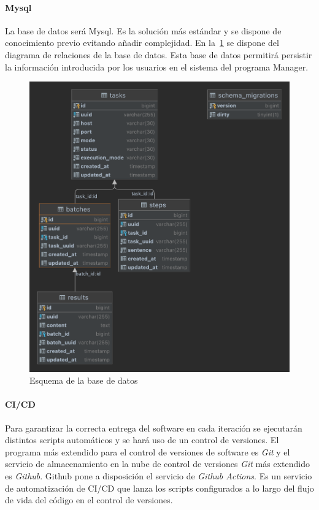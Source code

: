 \paragraph{Mysql}\label{par:mysql}

La base de datos será Mysql.
Es la solución más estándar y se dispone de conocimiento previo evitando añadir complejidad.
En la~\cref{fig:DBSchema} se dispone del diagrama de relaciones de la base de datos.
Esta base de datos permitirá persistir la información introducida por los usuarios en el sistema del programa Manager.\\

\begin{figure}[H]
    \centering
    \includegraphics[scale = 0.2]{part/Proyecto_ejecutivo/memoria_constructiva/dbSchema}
    \caption{Esquema de la base de datos}\label{fig:DBSchema}
\end{figure}

\paragraph{CI/CD}\label{par:cicd}

Para garantizar la correcta entrega del software en cada iteración se ejecutarán distintos scripts automáticos y se hará uso de un control de versiones.
El programa más extendido para el control de versiones de software es \textit{Git} y el servicio de almacenamiento en la nube de control de versiones \textit{Git} más extendido es \textit{Github}.
Github pone a disposición el servicio de \textit{Github Actions}.
Es un servicio de automatización de CI/CD que lanza los scripts configurados a lo largo del flujo de vida del código en el control de versiones.

